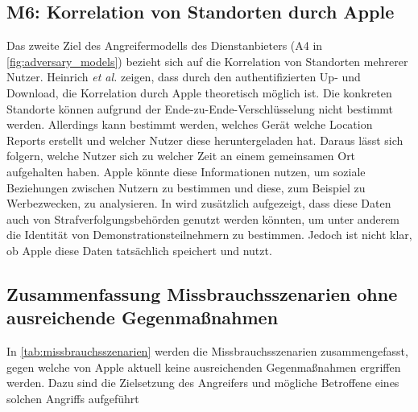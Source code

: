 \subsection[M6]{M6: Korrelation von Standorten durch Apple}
\label{missbrauch:6}

Das zweite Ziel des Angreifermodells des Dienstanbieters (A4 in \autoref{fig:adversary_models}) bezieht sich auf die Korrelation von Standorten mehrerer Nutzer.
Heinrich \textit{et al.} \cite{Heinrich_FindMy} zeigen, dass durch den authentifizierten Up- und Download, die Korrelation durch Apple theoretisch möglich ist.
Die konkreten Standorte können aufgrund der Ende-zu-Ende-Verschlüsselung nicht bestimmt werden.
Allerdings kann bestimmt werden, welches Gerät welche Location Reports erstellt und welcher Nutzer diese heruntergeladen hat.
Daraus lässt sich folgern, welche Nutzer sich zu welcher Zeit an einem gemeinsamen Ort aufgehalten haben.
Apple könnte diese Informationen nutzen, um soziale Beziehungen zwischen Nutzern zu bestimmen und diese, zum Beispiel zu Werbezwecken, zu analysieren.
In \cite{Heinrich_FindMy} wird zusätzlich aufgezeigt, dass diese Daten auch von Strafverfolgungsbehörden genutzt werden könnten, um unter anderem die Identität von Demonstrationsteilnehmern zu bestimmen.
Jedoch ist nicht klar, ob Apple diese Daten tatsächlich speichert und nutzt.




\subsection{Zusammenfassung Missbrauchsszenarien ohne ausreichende Gegenmaßnahmen}
In \autoref{tab:missbrauchsszenarien} werden die Missbrauchsszenarien zusammengefasst, gegen welche von Apple aktuell keine ausreichenden Gegenmaßnahmen ergriffen werden.
Dazu sind die Zielsetzung des Angreifers und mögliche Betroffene eines solchen Angriffs aufgeführt

